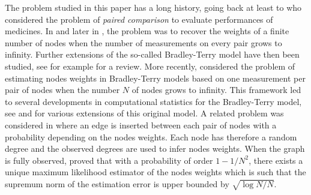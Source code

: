 The problem studied in this paper has a long history, going back at least to \cite{zemerlo:1929} who considered the problem of \emph{paired comparison} to evaluate performances of medicines. In \cite{zemerlo:1929} and later in  \cite{bradley:terry:1952}, the problem was to recover the weights of a finite number of nodes when the number of measurements on every pair grows to infinity. Further extensions of the so-called Bradley-Terry model have then been studied, see for example \cite{David:1963} for a review. More recently, \cite{Simons_Yao:1999} considered the problem of estimating nodes weights in Bradley-Terry models based on one measurement per pair of nodes when the number $N$ of nodes grows to infinity. This framework led to several developments in computational statistics for the Bradley-Terry model, see \cite{Hun:2004} and \cite{caron:doucet:2012} for various extensions of this original model. 
A related problem was considered in \cite{chatterjee:diaconis:sly:2011} where an edge is inserted between each pair of nodes with a probability depending on the nodes weights. Each node has therefore a random degree and the observed degrees are used to infer nodes weights. When the graph is fully observed, \cite{chatterjee:diaconis:sly:2011} proved that  with a probability of order $1-1/N^2$, there exists a unique maximum likelihood estimator of the nodes weights which is such that the supremum norm of the estimation error is upper bounded by $\sqrt{\log N/N}$. 

